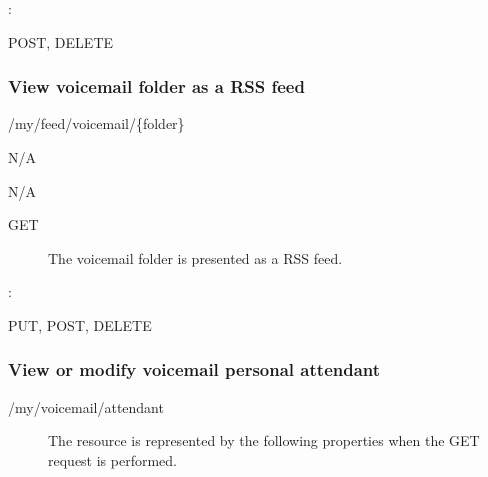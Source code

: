 \documentclass[letterpaper,10pt,english]{sphinxmanual}
\begin{document}
:

\begin{sphinxVerbatim}[commandchars=\\\{\}]
\end{sphinxVerbatim}

 POST, DELETE


\subsubsection{View voicemail folder as a RSS feed}
\label{\detokenize{restapi:view-voicemail-folder-as-a-rss-feed}}
 /my/feed/voicemail/\{folder\}

 N/A

 N/A
\begin{description}
\item[{ GET}] \leavevmode
The voicemail folder is presented as a RSS feed.

\end{description}

:

\begin{sphinxVerbatim}[commandchars=\\\{\}]
\end{sphinxVerbatim}

 PUT, POST, DELETE


\subsubsection{View or modify voicemail personal attendant}
\label{\detokenize{restapi:view-or-modify-voicemail-personal-attendant}}
 /my/voicemail/attendant
\begin{description}
\item[{}] \leavevmode
The resource is represented by the following properties when the GET request is performed.

\end{description}
\end{document}
